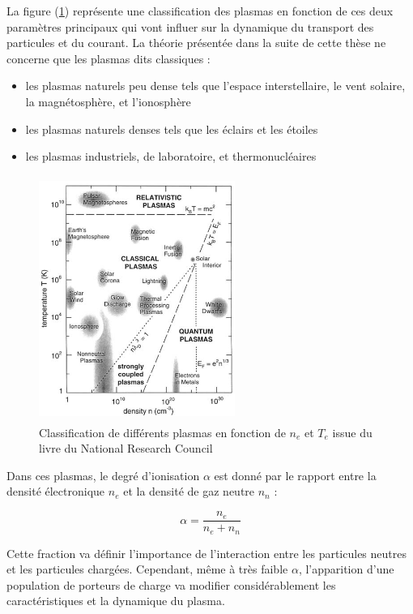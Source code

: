 \begin{refsection}
La figure (\ref{zoologie}) représente une classification des plasmas
en fonction de ces deux paramètres principaux qui vont influer sur la dynamique du
transport des particules et du courant.
La théorie présentée dans la suite de cette thèse ne concerne que les plasmas
dits classiques :

\begin{itemize}
  \item les plasmas naturels peu dense tels que l'espace interstellaire,
  le vent solaire, la magnétosphère, et l'ionosphère
  \item les plasmas naturels denses tels que les éclairs et les étoiles
  \item les plasmas industriels, de laboratoire, et thermonucléaires
\end{itemize}

\begin{figure}[htbp]
\centering
\includegraphics[height=80mm,width=64mm]{figures/1-zoologie.png}{\caption{Classification
de différents plasmas en fonction de $n_e$ et $T_e$ issue du livre du National
Research Council \parencite{NRC}}\label{zoologie}}
\end{figure}

Dans ces plasmas, le degré d'ionisation $\alpha$ est donné par le rapport
entre la densité électronique $n_{e}$ et la densité de gaz neutre
$n_{n}$ :

\begin{equation}
\alpha=\frac{n_{e}}{n_{e}+n_{n}}
\end{equation}

Cette fraction va définir l'importance de l'interaction entre les particules
neutres et les particules chargées. Cependant, même à très faible $\alpha$,
l'apparition d'une population de porteurs de charge va modifier considérablement 
les caractéristiques et la dynamique du plasma.


\end{refsection}
